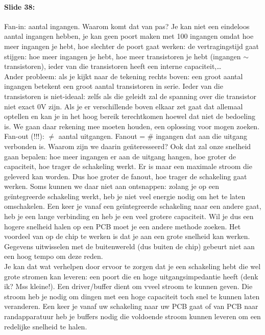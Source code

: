 \documentclass[10pt,a4paper]{book}
\begin{document}
\paragraph{Slide 38:} Fan-in: aantal ingangen. Waarom komt dat van pas? Je kan niet een eindeloos aantal ingangen hebben, je kan geen poort maken met 100 ingangen omdat hoe meer ingangen je hebt, hoe slechter de poort gaat werken: de vertragingstijd gaat stijgen: hoe meer ingangen je hebt, hoe meer transistoren je hebt (ingangen $\sim$transistoren), ieder van die transistoren heeft een interne capaciteit,\ldots \\
Ander probleem: als je kijkt naar de tekening rechts boven: een groot aantal ingangen betekent een groot aantal transistoren in serie. Ieder van die transistoren is niet-ideaal: zelfs als die geleidt zal de spanning over die transistor niet exact 0V zijn. Als je er verschillende boven elkaar zet gaat dat allemaal optellen en kan je in het hoog bereik terechtkomen hoewel dat niet de bedoeling is. We gaan daar rekening mee moeten houden, een oplossing voor mogen zoeken.\\
Fan-out (!!!): $\neq$ aantal uitgangen. Fanout = \# ingangen dat aan die uitgang verbonden is. Waarom zijn we daarin ge\"nteresseerd? Ook dat zal onze snelheid gaan bepalen: hoe meer ingangen er aan de uitgang hangen, hoe groter de capaciteit, hoe trager de schakeling werkt. Er is maar een maximale stroom die geleverd kan worden.  Dus hoe groter de fanout, hoe trager de schakeling gaat werken. 
Soms kunnen we daar niet aan ontsnappen: zolang je op een ge\"integreerde schakeling werkt, heb je niet veel energie nodig om het te laten omschakelen. Een keer je vanaf een ge\"integreerde schakeling naar een andere gaat, heb je een lange verbinding en heb je een veel grotere capaciteit. Wil je dus een hogere snelheid halen op een PCB moet je een andere methode zoeken. Het voordeel van op de chip te werken is dat je aan een grote snelheid kan werken. Gegevens uitwisselen met de buitenwereld (dus buiten de chip) gebeurt niet aan een hoog tempo om deze reden.\\
Je kan dat wat verhelpen door ervoor te zorgen dat je een schakeling hebt die wel grote stromen kan leveren: een poort die en hoge uitgangsimpedantie heeft (denk ik? Mss kleine!). %
Een driver/buffer dient om vveel stroom te kunnen geven. Die stroom heb je nodig om dingen met een hoge capaciteit toch snel te kunnen laten veranderen. Een keer je vanaf uw schakeling naar uw PCB gaat of van PCB naar randapparatuur heb je buffers nodig die voldoende stroom kunnen leveren om een redelijke snelheid te halen.
\end{document}
